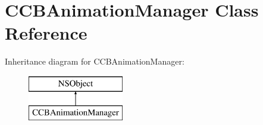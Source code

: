 \hypertarget{interface_c_c_b_animation_manager}{\section{C\-C\-B\-Animation\-Manager Class Reference}
\label{interface_c_c_b_animation_manager}
}
Inheritance diagram for C\-C\-B\-Animation\-Manager\-:\begin{figure}[H]
\begin{center}
\leavevmode
\includegraphics[height=2.000000cm]{interface_c_c_b_animation_manager}
\end{center}
\end{figure}
